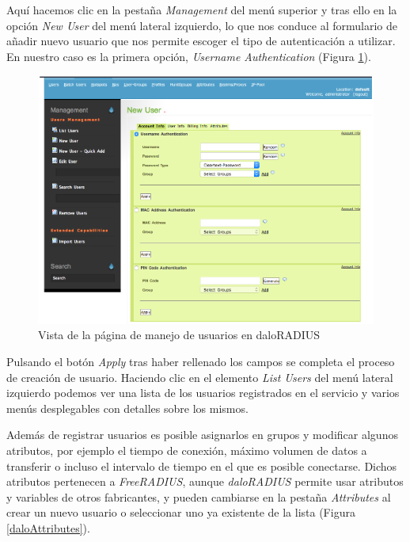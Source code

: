 Aquí hacemos clic en la pestaña \emph{Management} del menú superior y tras ello en la opción \emph{New User} del menú lateral izquierdo, lo que nos conduce al formulario de añadir nuevo usuario que nos permite escoger el tipo de autenticación a utilizar. En nuestro caso es la primera opción, \emph{Username Authentication} (Figura \ref{daloNewUser}).

\begin{figure}[!t]
\begin{center}
\includegraphics[width=0.75\linewidth]{./5_AnalisisOrganico/Img/daloNewUser.png}
\end{center}
\caption{Vista de la página de manejo de usuarios en daloRADIUS}
\label{daloNewUser}
\end{figure}

Pulsando el botón \emph{Apply} tras haber rellenado los campos se completa el proceso de creación de usuario. Haciendo clic en el elemento \emph{List Users} del menú lateral izquierdo podemos ver una lista de los usuarios registrados en el servicio y varios menús desplegables con detalles sobre los mismos.

Además de registrar usuarios es posible asignarlos en grupos y modificar algunos atributos, por ejemplo el tiempo de conexión, máximo volumen de datos a transferir o incluso el intervalo de tiempo en el que es posible conectarse. Dichos atributos pertenecen a \emph{FreeRADIUS}, aunque \emph{daloRADIUS} permite usar atributos y variables de otros fabricantes, y pueden cambiarse en la pestaña \emph{Attributes} al crear un nuevo usuario o seleccionar uno ya existente de la lista (Figura \ref{daloAttributes}).

